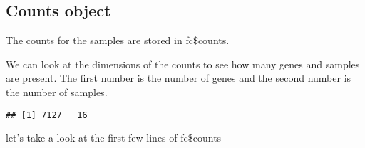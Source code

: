\documentclass[
]{book}
\newenvironment{Shaded}{\begin{snugshade}}{\end{snugshade}}
\newcommand{\FunctionTok}[1]{\textcolor[rgb]{0.13,0.29,0.53}{\textbf{#1}}}
\newcommand{\NormalTok}[1]{#1}
\newcommand{\SpecialCharTok}[1]{\textcolor[rgb]{0.81,0.36,0.00}{\textbf{#1}}}
\begin{document}
\hypertarget{counts-object}{%
\subsection{Counts object}\label{counts-object}}

The counts for the samples are stored in fc\$counts.

We can look at the dimensions of the counts to see how many genes and samples are present. The first number is the number of genes and the second number is the number of samples.

\begin{Shaded}
\end{Shaded}

\begin{verbatim}
## [1] 7127   16
\end{verbatim}

let's take a look at the first few lines of fc\$counts

\begin{Shaded}
\end{Shaded}
\end{document}
